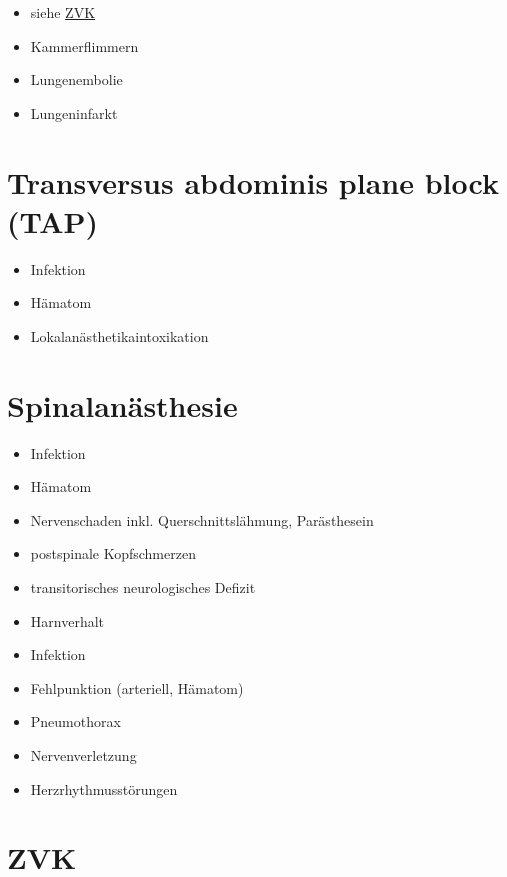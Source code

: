 \documentclass[
]{book}
\providecommand{\tightlist}{%
  \setlength{\itemsep}{0pt}\setlength{\parskip}{0pt}}
\begin{document}
\begin{itemize}
\tightlist
\item
  siehe \protect\hyperlink{zvk}{ZVK}
\item
  Kammerflimmern
\item
  Lungenembolie
\item
  Lungeninfarkt
\end{itemize}

\hypertarget{transversus-abdominis-plane-block-tap}{%
\section{Transversus abdominis plane block (TAP)}\label{transversus-abdominis-plane-block-tap}}

\begin{itemize}
\tightlist
\item
  Infektion
\item
  Hämatom
\item
  Lokalanästhetikaintoxikation
\end{itemize}

\hypertarget{spinalanuxe4sthesie}{%
\section{Spinalanästhesie}\label{spinalanuxe4sthesie}}

\begin{itemize}
\tightlist
\item
  Infektion
\item
  Hämatom
\item
  Nervenschaden inkl. Querschnittslähmung, Parästhesein
\item
  postspinale Kopfschmerzen
\item
  transitorisches neurologisches Defizit
\item
  Harnverhalt
\item
  Infektion
\item
  Fehlpunktion (arteriell, Hämatom)
\item
  Pneumothorax
\item
  Nervenverletzung
\item
  Herzrhythmusstörungen
\end{itemize}

\hypertarget{zvk}{%
\section{ZVK}\label{zvk}}
\end{document}

